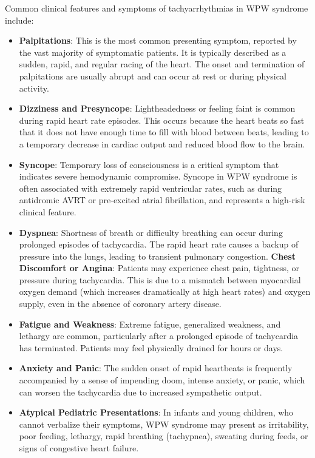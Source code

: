 Common clinical features and symptoms of tachyarrhythmias in WPW syndrome include:
\begin{itemize}
  \item \textbf{Palpitations}: This is the most common presenting symptom, reported by the vast majority of symptomatic patients. It is typically described as a sudden, rapid, and regular racing of the heart. The onset and termination of palpitations are usually abrupt and can occur at rest or during physical activity.
  \item \textbf{Dizziness and Presyncope}: Lightheadedness or feeling faint is common during rapid heart rate episodes. This occurs because the heart beats so fast that it does not have enough time to fill with blood between beats, leading to a temporary decrease in cardiac output and reduced blood flow to the brain.
  \item \textbf{Syncope}: Temporary loss of consciousness is a critical symptom that indicates severe hemodynamic compromise. Syncope in WPW syndrome is often associated with extremely rapid ventricular rates, such as during antidromic AVRT or pre-excited atrial fibrillation, and represents a high-risk clinical feature.
  \item \textbf{Dyspnea}: Shortness of breath or difficulty breathing can occur during prolonged episodes of tachycardia. The rapid heart rate causes a backup of pressure into the lungs, leading to transient pulmonary congestion.
  \textbf{Chest Discomfort or Angina}: Patients may experience chest pain, tightness, or pressure during tachycardia. This is due to a mismatch between myocardial oxygen demand (which increases dramatically at high heart rates) and oxygen supply, even in the absence of coronary artery disease.
  \item \textbf{Fatigue and Weakness}: Extreme fatigue, generalized weakness, and lethargy are common, particularly after a prolonged episode of tachycardia has terminated. Patients may feel physically drained for hours or days.
  \item \textbf{Anxiety and Panic}: The sudden onset of rapid heartbeats is frequently accompanied by a sense of impending doom, intense anxiety, or panic, which can worsen the tachycardia due to increased sympathetic output.
  \item \textbf{Atypical Pediatric Presentations}: In infants and young children, who cannot verbalize their symptoms, WPW syndrome may present as irritability, poor feeding, lethargy, rapid breathing (tachypnea), sweating during feeds, or signs of congestive heart failure.
\end{itemize}

